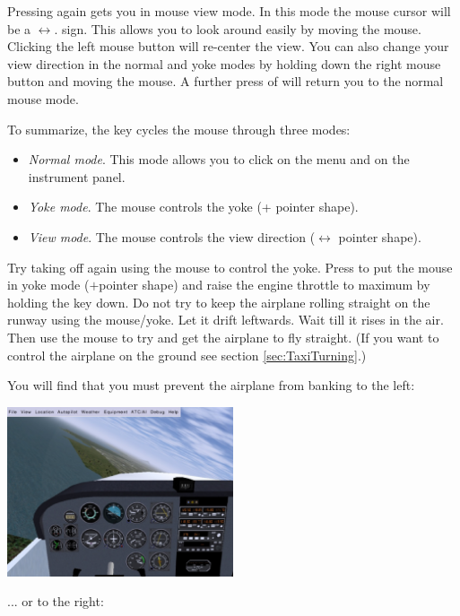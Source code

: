 \begin{itemize}
Pressing  again gets you in mouse view mode. In this mode the mouse cursor will
be a $\leftrightarrow$. sign. This allows you to look around easily by moving
the mouse. Clicking the left mouse button will re-center the view.  You can also
change your view direction in the normal and yoke modes by holding down the right
mouse button and moving the mouse. A further press of  will return you to the
normal mouse mode.

To summarize, the  key cycles the mouse through three modes:
\begin{itemize}
    \item \textit{Normal mode}. This mode allows you to
  click on the menu and on the instrument panel.
    \item \textit{Yoke mode}.
  The mouse controls the yoke (+ pointer shape).
    \item \textit{View mode}. The mouse controls the
  view direction ($\leftrightarrow$ pointer shape).
\end{itemize}

Try taking off again using the mouse to control the yoke. Press  to put
the mouse in yoke mode ($+$pointer shape) and raise the engine throttle to
maximum by holding the  key down. Do not try to keep the airplane
rolling straight on the runway using the mouse/yoke. Let it drift leftwards.
Wait till it rises in the air. Then use the mouse to try and get the
airplane to fly straight. (If you want to control the airplane on the
ground see section \ref{sec:TaxiTurning}.)

You will find that you must prevent the airplane from banking to the left:

\begin{center}
\includegraphics[width=0.5\textwidth]{img/tut_11}
\end{center}

... or to the right:



\end{itemize}
